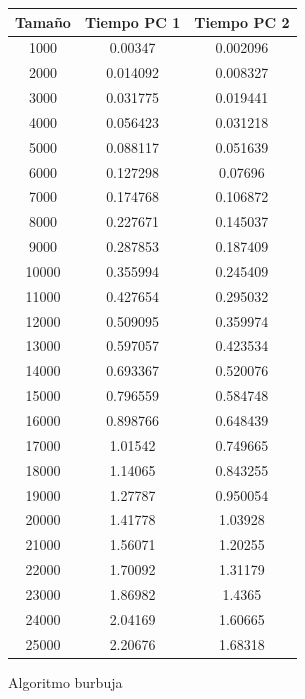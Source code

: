 \documentclass[12pt,spanish]{article}
\begin{document}
\begin{figure}[H]
\begin{tabular}{|c|c|c|}
\hline
\textbf{Tamaño} & \textbf{Tiempo PC 1} & \textbf{Tiempo PC 2} \\
\hline
1000 & 0.00347 & 0.002096 \\
\hline
2000 & 0.014092 & 0.008327 \\
\hline
3000 & 0.031775 & 0.019441 \\
\hline
4000 & 0.056423 & 0.031218 \\
\hline
5000 & 0.088117 & 0.051639\\
\hline
6000 & 0.127298 & 0.07696\\
\hline
7000 & 0.174768 & 0.106872\\
\hline
8000 & 0.227671 & 0.145037\\
\hline
9000 & 0.287853 & 0.187409\\
\hline
10000 & 0.355994 & 0.245409\\
\hline
11000 & 0.427654 & 0.295032\\
\hline
12000 & 0.509095 & 0.359974\\
\hline
13000 & 0.597057 & 0.423534\\
\hline
14000 & 0.693367 & 0.520076\\
\hline
15000 & 0.796559 & 0.584748\\
\hline
16000 & 0.898766 & 0.648439\\
\hline
17000 & 1.01542 & 0.749665\\
\hline
18000 & 1.14065 & 0.843255\\
\hline
19000 & 1.27787 & 0.950054\\
\hline
20000 & 1.41778 & 1.03928\\
\hline
21000 & 1.56071 & 1.20255\\
\hline
22000 & 1.70092 & 1.31179\\
\hline
23000 & 1.86982 & 1.4365\\
\hline
24000 & 2.04169 & 1.60665\\
\hline
25000 & 2.20676 & 1.68318 \\
\hline
\end{tabular}
\caption{Algoritmo burbuja}
\end{figure}
\end{document}
